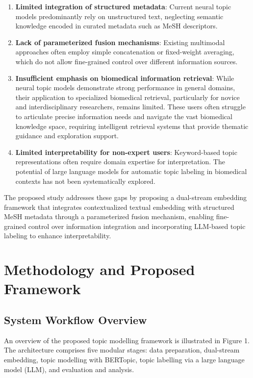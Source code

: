 \documentclass[authorproof,JACIII,researchpaper]{fujipressarticle}
\begin{document}
\begin{enumerate}[leftmargin=*,label=\arabic*)]
    \item \textbf{Limited integration of structured metadata}: Current neural topic models predominantly rely on unstructured text, neglecting semantic knowledge encoded in curated metadata such as MeSH descriptors.

    \item \textbf{Lack of parameterized fusion mechanisms}: Existing multimodal approaches often employ simple concatenation or fixed-weight averaging, which do not allow fine-grained control over different information sources.

    \item \textbf{Insufficient emphasis on biomedical information retrieval}: While neural topic models demonstrate strong performance in general domains, their application to specialized biomedical retrieval, particularly for novice and interdisciplinary researchers, remains limited. These users often struggle to articulate precise information needs and navigate the vast biomedical knowledge space, requiring intelligent retrieval systems that provide thematic guidance and exploration support.

    \item \textbf{Limited interpretability for non-expert users}: Keyword-based topic representations often require domain expertise for interpretation. The potential of large language models for automatic topic labeling in biomedical contexts has not been systematically explored.
\end{enumerate}

The proposed study addresses these gaps by proposing a dual-stream embedding framework that integrates contextualized textual embedding with structured MeSH metadata through a parameterized fusion mechanism, enabling fine-grained control over information integration and incorporating LLM-based topic labeling to enhance interpretability.


\section{Methodology and Proposed Framework}
\subsection{System Workflow Overview}
An overview of the proposed topic modelling framework is illustrated in Figure 1. The architecture comprises five modular stages: data preparation, dual-stream embedding, topic modelling with BERTopic, topic labelling via a large language model (LLM), and evaluation and analysis.
\end{document}
